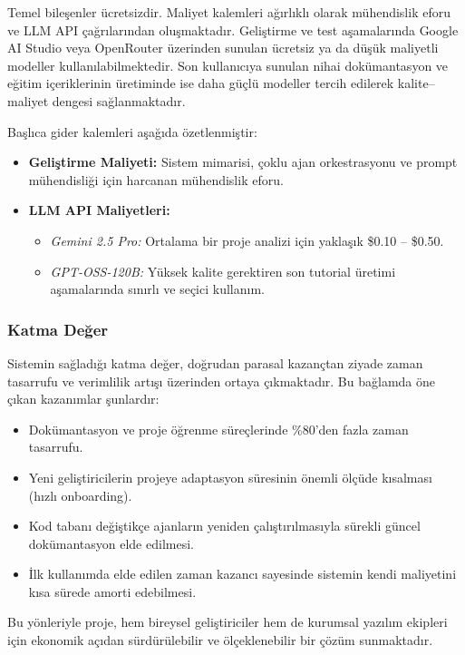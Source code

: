Temel bileşenler ücretsizdir. Maliyet kalemleri ağırlıklı olarak mühendislik eforu ve LLM API çağrılarından oluşmaktadır. Geliştirme ve test aşamalarında Google AI Studio veya OpenRouter üzerinden sunulan ücretsiz ya da düşük maliyetli modeller kullanılabilmektedir. Son kullanıcıya sunulan nihai dokümantasyon ve eğitim içeriklerinin üretiminde ise daha güçlü modeller tercih edilerek kalite–maliyet dengesi sağlanmaktadır.

Başlıca gider kalemleri aşağıda özetlenmiştir:

\begin{itemize}
    \item \textbf{Geliştirme Maliyeti:} Sistem mimarisi, çoklu ajan orkestrasyonu ve prompt mühendisliği için harcanan mühendislik eforu.
    \item \textbf{LLM API Maliyetleri:}
    \begin{itemize}
        \item \textit{Gemini 2.5 Pro:} Ortalama bir proje analizi için yaklaşık \$0.10 – \$0.50.
        \item \textit{GPT-OSS-120B:} Yüksek kalite gerektiren son tutorial üretimi aşamalarında sınırlı ve seçici kullanım.
    \end{itemize}
\end{itemize}

\subsubsection{Katma Değer}

Sistemin sağladığı katma değer, doğrudan parasal kazançtan ziyade zaman tasarrufu ve verimlilik artışı üzerinden ortaya çıkmaktadır. Bu bağlamda öne çıkan kazanımlar şunlardır:

\begin{itemize}
    \item Dokümantasyon ve proje öğrenme süreçlerinde \%80’den fazla zaman tasarrufu.
    \item Yeni geliştiricilerin projeye adaptasyon süresinin önemli ölçüde kısalması (hızlı onboarding).
    \item Kod tabanı değiştikçe ajanların yeniden çalıştırılmasıyla sürekli güncel dokümantasyon elde edilmesi.
    \item İlk kullanımda elde edilen zaman kazancı sayesinde sistemin kendi maliyetini kısa sürede amorti edebilmesi.
\end{itemize}

Bu yönleriyle proje, hem bireysel geliştiriciler hem de kurumsal yazılım ekipleri için ekonomik açıdan sürdürülebilir ve ölçeklenebilir bir çözüm sunmaktadır.


